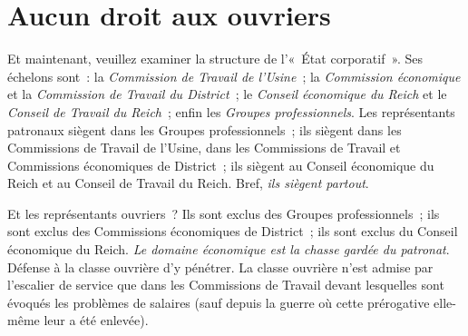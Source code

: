 \documentclass[french,twoside]{book} %
\begin{document}
\section[{Aucun droit aux ouvriers}]{Aucun droit aux ouvriers}
\noindent Et maintenant, veuillez examiner la structure de l’« État corporatif ». Ses échelons sont : la \emph{Commission de Travail de l’Usine} ; la \emph{Commission économique} et la \emph{Commission de Travail du District} ; le \emph{Conseil économique du Reich} et le \emph{Conseil de Travail du Reich} ; enfin les \emph{Groupes professionnels}. Les représentants patronaux siègent dans les Groupes professionnels ; ils siègent dans les Commissions de Travail de l’Usine, dans les Commissions de Travail et Commissions économiques de District ; ils siègent au Conseil économique du Reich et au Conseil de Travail du Reich. Bref, \emph{ils siègent partout}.\par
Et les représentants ouvriers ? Ils sont exclus des Groupes professionnels ; ils sont exclus des Commissions économiques de District ; ils sont exclus du Conseil économique du Reich. \emph{Le domaine économique est la chasse gardée du patronat}. Défense à la classe ouvrière d’y pénétrer. La classe ouvrière n’est admise par l’escalier de service que dans les Commissions de Travail devant lesquelles sont évoqués les problèmes de salaires (sauf depuis la guerre où cette prérogative elle-même leur a été enlevée).
\end{document}

